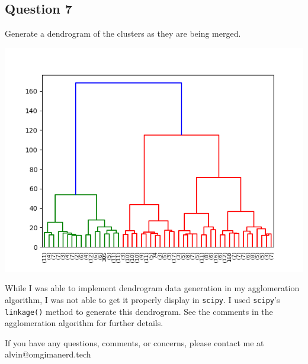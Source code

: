 \documentclass{math}
\begin{document}
\subsection*{Question 7}
Generate a dendrogram of the clusters as they are being merged.
\begin{center}
  \includegraphics[width=16cm]{assets/hw_06_dendrogram.png}
\end{center}
While I was able to implement dendrogram data generation in my agglomeration
algorithm, I was not able to get it properly display in \texttt{scipy}. I used
\texttt{scipy}'s \texttt{linkage()} method to generate this dendrogram. See
the comments in the agglomeration algorithm for further details.

\begin{center}
  If you have any questions, comments, or concerns, please contact me at
  alvin@omgimanerd.tech
\end{center}
\end{document}
